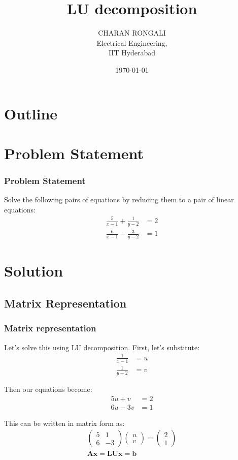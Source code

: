 \documentclass{beamer}
\title{LU decomposition}
\author{CHARAN RONGALI \\ Electrical Engineering,\\IIT Hyderabad}
\date{\today}
\theoremstyle{remark}
\newcommand{\myvec}[1]{\ensuremath{\begin{pmatrix}#1\end{pmatrix}}}
\let\vec\mathbf
\numberwithin{equation}{section}
\begin{document}
\begin{frame}
\titlepage
\end{frame}

\section*{Outline}
\begin{frame}
\tableofcontents
\end{frame}

\section{Problem Statement}
\begin{frame}
\frametitle{Problem Statement}
Solve the following pairs of equations by reducing them to a pair of linear equations:
\begin{align*}
    \frac{5}{x-1} + \frac{1}{y-2} &= 2\\
    \frac{6}{x-1} - \frac{3}{y-2} &= 1
\end{align*}
\end{frame}

\section{Solution}
\subsection{Matrix Representation}
\begin{frame}
\frametitle{Matrix representation}
Let's solve this using LU decomposition. First, let's substitute:
\begin{align}
    \frac{1}{x-1} &= u\\
    \frac{1}{y-2} &= v
\end{align}

Then our equations become:
\begin{align}
    5u + v &= 2 \\
    6u - 3v &= 1
\end{align}

This can be written in matrix form as:
\begin{align}
    \myvec{5 & 1\\6 & -3}\myvec{u\\v} = \myvec{2\\1}\\
	\vec{ A}\vec{x} = \vec{L}\vec{U}\vec{x} = \vec{b}
\end{align}
\end{frame}
\end{document}
